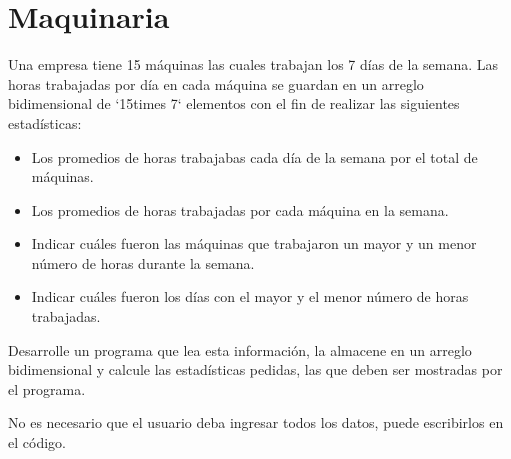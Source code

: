 \section{Maquinaria}

Una empresa tiene 15 máquinas las cuales trabajan los 7 días de la
semana. Las horas trabajadas por día en cada máquina se guardan en un
arreglo bidimensional de `15times 7` elementos con el fin de realizar
las siguientes estadísticas:

\begin{itemize}
\item
  Los promedios de horas trabajabas cada día de la semana por el total
  de máquinas.
\item
  Los promedios de horas trabajadas por cada máquina en la semana.
\item
  Indicar cuáles fueron las máquinas que trabajaron un mayor y un menor
  número de horas durante la semana.
\item
  Indicar cuáles fueron los días con el mayor y el menor número de horas
  trabajadas.
\end{itemize}

Desarrolle un programa que lea esta información, la almacene en un
arreglo bidimensional y calcule las estadísticas pedidas, las que deben
ser mostradas por el programa.

No es necesario que el usuario deba ingresar todos los datos, puede
escribirlos en el código.
